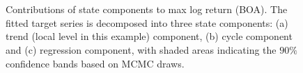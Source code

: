 \documentclass[twoside,11pt]{article}
\begin{document}
\begin{figure}[p]
	\centering
	\\
	\\
	\caption{Contributions of state components to max log return (BOA). The fitted target series is decomposed into three state components: (a) trend (local level in this example) component, (b) cycle component and (c) regression component, 
with shaded areas indicating the $90\%$ confidence bands based on MCMC draws.}
	\label{fig:stateboa}
\end{figure}


\end{document}
